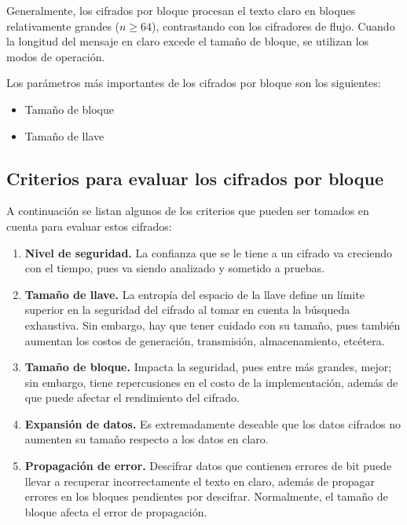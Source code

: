 Generalmente, los cifrados por bloque procesan el texto claro en bloques
relativamente grandes ($n \geq 64$), contrastando con los cifradores de
flujo. Cuando la longitud del mensaje en claro excede el tamaño de
bloque, se utilizan los modos de operación.

Los parámetros más importantes de los cifrados por bloque son los
siguientes:
\begin{itemize}
	\item Tamaño de bloque
	\item Tamaño de llave
\end{itemize}

\subsection{Criterios para evaluar los cifrados por bloque}

A continuación se listan algunos de los criterios que pueden ser tomados en cuenta para evaluar estos cifrados:
\begin{enumerate}
	\item \textbf{Nivel de seguridad.} La confianza que se le tiene a un
		cifrado va creciendo con el tiempo, pues va siendo analizado y
		sometido a pruebas.
	\item \textbf{Tamaño de llave.} La entropía del espacio de la llave
		define un límite superior en la seguridad del cifrado al tomar en
		cuenta la búsqueda exhaustiva. Sin embargo, hay que tener cuidado
		con su tamaño, pues también aumentan los costos de generación,
		transmisión, almacenamiento, etcétera.
	\item \textbf{Tamaño de bloque.} Impacta la seguridad, pues entre más
		grandes, mejor; sin embargo, tiene repercusiones en el costo de la
		implementación, además de que puede afectar el rendimiento del
		cifrado.
	\item \textbf{Expansión de datos.} Es extremadamente deseable que los
		datos cifrados no aumenten su tamaño respecto a los datos en claro.
	\item \textbf{Propagación de error.} Descifrar datos que contienen
		errores de bit puede llevar a recuperar incorrectamente el texto en
		claro, además de propagar errores en los bloques pendientes por
		descifrar. Normalmente, el tamaño de bloque afecta el error de
		propagación.
\end{enumerate}








